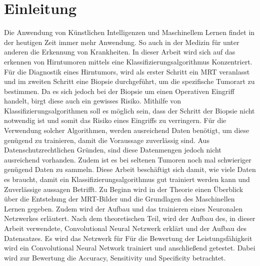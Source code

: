 \chapter{Einleitung}

Die Anwendung von Künstlichen Intelligenzen und Maschinellem Lernen findet in der heutigen Zeit immer mehr Anwendung.
So auch in der Medizin für unter anderen die Erkennung von Krankheiten.
In dieser Arbeit wird sich auf das erkennen von Hirntumoren mittels eine Klassifizierungsalgorithmus Konzentriert.
Für die Diagnostik eines Hirntumors, wird als erster Schritt ein MRT veranlasst und im zweiten Schritt eine Biopsie 
durchgeführt, um die spezifische Tumorart zu bestimmen.
Da es sich jedoch bei der Biopsie um einen Operativen Eingriff handelt, birgt diese auch ein gewisses Risiko.
Mithilfe von Klassifizierungsalgorithmen soll es möglich sein, dass der Schritt der Biopsie nicht notwendig ist 
und somit das Risiko eines Eingriffs zu verringern.
Für die Verwendung solcher Algorithmen, werden ausreichend Daten benötigt, um diese genügend zu trainieren, damit die 
Voraussage zuverlässig sind. 
Aus Datenschutzrechtlichen Gründen, sind diese Datenmengen jedoch nicht ausreichend vorhanden. Zudem ist es bei seltenen
Tumoren noch mal schwieriger genügend Daten zu sammeln.
Diese Arbeit beschäftigt sich damit, wie viele Daten es braucht, damit ein Klassifizierungsalgorithmus gut trainiert werden
kann und Zuverlässige aussagen Betrifft. 
Zu Beginn wird in der Theorie einen Überblick über die Entstehung der MRT-Bilder und die Grundlagen des Maschinellen Lernen gegeben.
Zudem wird der Aufbau und das trainieren eines Neuronalen Netzwerkes erläutert.
Nach dem theoretischen Teil, wird der Aufbau des, in dieser Arbeit verwendete, Convolutional Neural Netzwerk erklärt und der Aufbau des Datensatzes.
Es wird das Netzwerk für 
Für die Bewertung der Leistungsfähigkeit wird ein Convolutional Neural Network trainiert und anschließend getestet.
Dabei wird zur Bewertung die Accuracy, Sensitivity und Specificity betrachtet.

